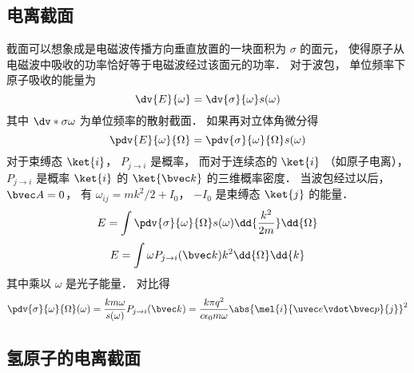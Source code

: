 \subsection{电离截面}
截面可以想象成是电磁波传播方向垂直放置的一块面积为 $\sigma$ 的面元， 使得原子从电磁波中吸收的功率恰好等于电磁波经过该面元的功率． 对于波包， 单位频率下原子吸收的能量为
\begin{equation}
\dv{E}{\omega} = \dv{\sigma}{\omega} s(\omega)
\end{equation}
其中 $\dv*{\sigma}{\omega}$ 为单位频率的散射截面． 如果再对立体角微分得
\begin{equation}
\pdv{E}{\omega}{\Omega} = \pdv{\sigma}{\omega}{\Omega} s(\omega)
\end{equation}
对于束缚态 $\ket{i}$， $P_{j\to i}$ 是概率， 而对于连续态的 $\ket{i}$ （如原子电离）， $P_{j\to i}$ 是概率 $\ket{i}$ 的 $\ket{\bvec k}$ 的三维概率密度． 当波包经过以后， $\bvec A = 0$， 有 $\omega_{ij} = mk^2/2 + I_0$， $-I_0$ 是束缚态 $\ket{j}$ 的能量．
\begin{equation}
E = \int \pdv{\sigma}{\omega}{\Omega} s(\omega) \dd{\frac{k^2}{2m}}\dd{\Omega}
\end{equation}
\begin{equation}
E = \int \omega P_{j\to i}(\bvec k) k^2\dd{\Omega}\dd{k}
\end{equation}
其中乘以 $\omega$ 是光子能量． 对比得 %
\begin{equation}
\pdv{\sigma}{\omega}{\Omega}(\omega) = \frac{km \omega}{s(\omega)} P_{j\to i}(\bvec k)
= \frac{k\pi q^2}{c\epsilon_0 m \omega} \abs{\mel{i}{\uvec e \vdot \bvec p}{j}}^2
\end{equation}

\subsection{氢原子的电离截面}

